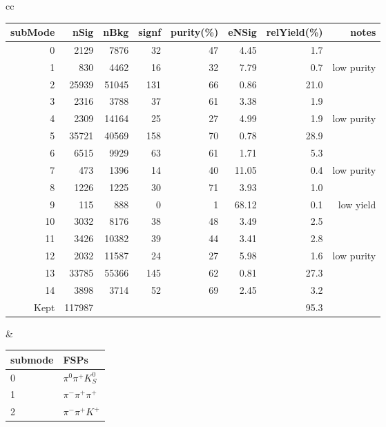 \begin{table}[h!]
\begin{center}
\begin{tabular}{cc}

\begin{tabular}{|rrrrrrrr|}
\hline
subMode  &  nSig &  nBkg &  signf&  purity(\%)&eNSig & relYield(\%)  & notes\\
\hline
0        &  2129 &  7876 &  32   &  47       &  4.45 & 1.7           & \\
1        &  830  &  4462 &  16   &  32       &  7.79 & 0.7           & low purity\\
2        &  25939&  51045&  131  &  66       &  0.86 & 21.0          & \\
3        &  2316 &  3788 &  37   &  61       &  3.38 & 1.9           & \\
4        &  2309 &  14164&  25   &  27       &  4.99 & 1.9           & low purity\\
5        &  35721&  40569&  158  &  70       &  0.78 & 28.9          & \\
6        &  6515 &  9929 &  63   &  61       &  1.71 & 5.3           & \\
7        &  473  &  1396 &  14   &  40       &  11.05& 0.4           & low purity\\
8        &  1226 &  1225 &  30   &  71       &  3.93 & 1.0           & \\
9        &  115  &  888  &  0    &  1        &  68.12& 0.1           & low yield\\
10       &  3032 &  8176 &  38   &  48       &  3.49 & 2.5           & \\
11       &  3426 &  10382&  39   &  44       &  3.41 & 2.8           & \\
12       &  2032 &  11587&  24   &  27       &  5.98 & 1.6           & low purity\\
13       &  33785&  55366&  145  &  62       &  0.81 & 27.3          & \\
14       &  3898 &  3714 &  52   &  69       &  2.45 & 3.2           & \\
\hline
Kept&117987&&&&&95.3&\\
\hline
\end{tabular}
&
\begin{tabular}{|ll|}
\hline
submode& FSPs\\
\hline
0 & $\pi^0 \pi^+ K_S^0 $ \\
1 & $\pi^- \pi^+ \pi^+ $ \\
2 & $\pi^- \pi^+ K^+ $ \\

\end{tabular}
\end{tabular}
\end{center}
\end{table}
